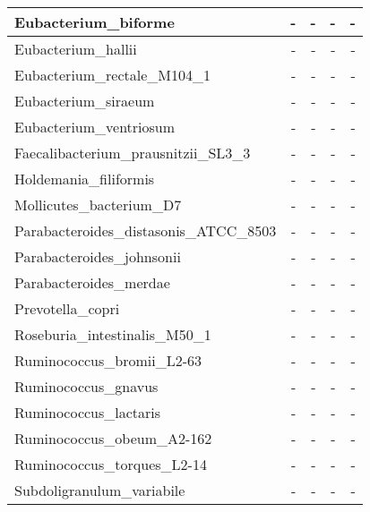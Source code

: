 \documentclass[12pt,a4paper]{article}
\begin{document}
\begin{table}[ht]
\begin{center}
\begin{tabular}{|l*{4}{|r}|}
Eubacterium\_biforme & - & - & - & - \\ \hline
Eubacterium\_hallii & - & - & - & - \\ \hline
Eubacterium\_rectale\_M104\_1 & - & - & - & - \\ \hline
Eubacterium\_siraeum & - & - & - & - \\ \hline
Eubacterium\_ventriosum & - & - & - & - \\ \hline
Faecalibacterium\_prausnitzii\_SL3\_3 & - & - & - & - \\ \hline
Holdemania\_filiformis & - & - & - & - \\ \hline
Mollicutes\_bacterium\_D7 & - & - & - & - \\ \hline
Parabacteroides\_distasonis\_ATCC\_8503 & - & - & - & - \\ \hline
Parabacteroides\_johnsonii & - & - & - & - \\ \hline
Parabacteroides\_merdae & - & - & - & - \\ \hline
Prevotella\_copri & - & - & - & - \\ \hline
Roseburia\_intestinalis\_M50\_1 & - & - & - & - \\ \hline
Ruminococcus\_bromii\_L2-63 & - & - & - & - \\ \hline
Ruminococcus\_gnavus & - & - & - & - \\ \hline
Ruminococcus\_lactaris & - & - & - & - \\ \hline
Ruminococcus\_obeum\_A2-162 & - & - & - & - \\ \hline
Ruminococcus\_torques\_L2-14 & - & - & - & - \\ \hline
Subdoligranulum\_variabile & - & - & - & - \\ \hline
\end{tabular}
\end{center}
\end{table}
\end{document}
